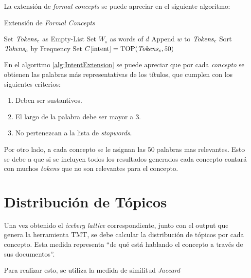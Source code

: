 \documentclass[12pt,oneside,letterpaper]{book}
\newcommand{\eng}[1]{\textit{#1}\xspace}			%
\newcommand{\abr}[1]{\textsc{#1}\xspace}           %
\theoremstyle{definition}
\begin{document}
La extensión de \eng{formal concepts} se puede apreciar en el siguiente algoritmo:

\begin{algorithm}[h!]
	\caption{Extensión de \eng{Formal Concepts}}
	\label{alg:IntentExtension}
	\begin{algorithmic}[1]
			\State Set $\text{\emph{Tokens}}_c$ as Empty-List
			\State Set $W_s$ as words of $d$
								\State Append $w$ to $\text{\emph{Tokens}}_c$
							\EndIf
						\EndIf
					\EndIf
				\EndFor
			\EndFor
			\State Sort $\text{\emph{Tokens}}_c$ by Frequency
			\State Set $C[\text{intent}] = \text{TOP}(\text{\emph{Tokens}}_c, 50)$
		\EndFor
		\EndProcedure
	\end{algorithmic}
\end{algorithm}

En el algoritmo \ref{alg:IntentExtension} se puede apreciar que por cada \emph{concepto} se obtienen las palabras más representativas de los títulos, que cumplen con los siguientes criterios:

\begin{enumerate}
	\item Deben ser sustantivos.
	\item El largo de la palabra debe ser mayor a 3.	
	\item No pertenezcan a la lista de \eng{stopwords}.
\end{enumerate}

Por otro lado, a cada concepto se le asignan las $50$ palabras mas relevantes. Esto se debe a que si se incluyen todos los resultados generados cada concepto contará con muchos \eng{tokens} que no son relevantes para el concepto.


\section{Distribución de Tópicos}
\label{sec:distribucion_de_topicos}
Una vez obtenido el \eng{iceberg lattice} correspondiente, junto con el output que genera la herramienta \abr{TMT}, se debe calcular la distribución de tópicos por cada concepto. Esta medida representa ``de qué está hablando el concepto a través de sus documentos''.

Para realizar esto, se utiliza la medida de similitud \eng{Jaccard}
\end{document}
